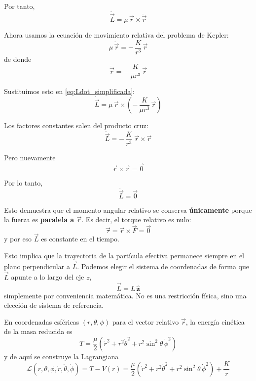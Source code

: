 \documentclass{article}
\begin{document}
Por tanto,
\begin{equation}
\dot{\vec L}
= \mu\,\vec r \times \ddot{\vec r}
\label{eq:Ldot_simplificada}
\end{equation}

Ahora usamos la ecuación de movimiento relativa del problema de Kepler:
\[
\mu\,\ddot{\vec r}
= -\,\frac{K}{r^{3}}\,\vec r
\]
de donde
\[
\ddot{\vec r} = -\,\frac{K}{\mu r^{3}}\,\vec r
\]

Sustituimos esto en \eqref{eq:Ldot_simplificada}:
\begin{equation}
\dot{\vec L}
= \mu\,\vec r \times \left(
 -\,\frac{K}{\mu r^{3}}\,\vec r
\right)
\label{eq:sustitucion_Ldot}
\end{equation}

Los factores constantes salen del producto cruz:
\[
\dot{\vec L}
= -\,\frac{K}{r^{3}}\;\vec r \times \vec r
\]

Pero nuevamente
\[
\vec r \times \vec r = \vec 0
\]

Por lo tanto,
\begin{equation}
\boxed{
\dot{\vec L} = \vec 0
}
\label{eq:L_conservado}
\end{equation}

Esto demuestra que el momento angular relativo se conserva
\textbf{únicamente} porque la fuerza es \textbf{paralela a \(\vec r\)}.  
Es decir, el torque relativo es nulo:
\[
\vec \tau = \vec r \times \vec F = \vec 0
\]
y por eso \(\vec L\) es constante en el tiempo.


Esto implica que la trayectoria de la partícula efectiva permanece
siempre en el plano perpendicular a \(\vec L\).  
Podemos elegir el sistema de coordenadas de forma que
\(\vec L\) apunte a lo largo del eje \(z\),
\begin{equation}
\vec L = L\,\hat{\mathbf z}
\label{eq:L_en_z}
\end{equation}
simplemente por conveniencia matemática. No es una restricción física,
sino una elección de sistema de referencia.

En coordenadas esféricas \((r,\theta,\phi)\) para el vector relativo \(\vec r\),
la energía cinética de la masa reducida es
\begin{equation}
T
= \frac{\mu}{2}\left(
\dot r^{2} + r^{2}\dot{\theta}^{2}
+ r^{2}\sin^{2}\theta\,\dot{\phi}^{2}
\right)
\label{eq:T_esfericas}
\end{equation}
y de aquí se construye la Lagrangiana
\begin{equation}
\mathcal{L}(r,\theta,\phi,\dot r,\dot{\theta},\dot{\phi})
= T - V(r)
= \frac{\mu}{2}\left(
\dot r^{2} + r^{2}\dot{\theta}^{2}
+ r^{2}\sin^{2}\theta\,\dot{\phi}^{2}
\right)
+ \frac{K}{r}
\label{eq:Lagrangiana_esfericas}
\end{equation}
\end{document}
